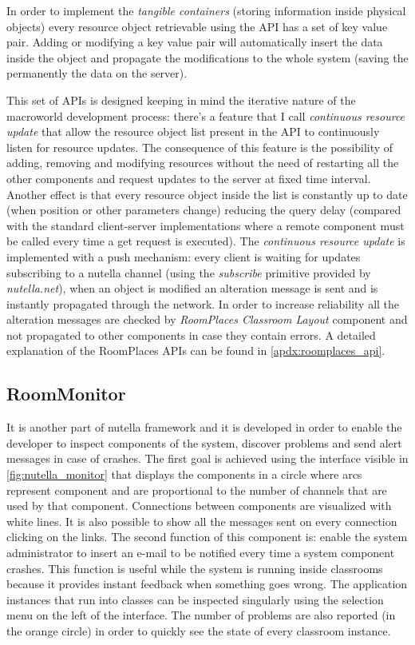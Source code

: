 In order to implement the \textit{tangible containers} (storing information inside physical objects) every resource object retrievable using the API has a set of key value pair. Adding or modifying a key value pair will automatically insert the data inside the object and propagate the modifications to the whole system (saving the permanently the data on the server).

This set of APIs is designed keeping in mind the iterative nature of the macroworld development process: there's a feature that I call \textit{continuous resource update} that allow the resource object list present in the API to continuously listen for resource updates. The consequence of this feature is the possibility of adding, removing and modifying resources without the need of restarting all the other components and request updates to the server at fixed time interval. Another effect is that every resource object inside the list is constantly up to date (when position or other parameters change) reducing the query delay (compared with the standard client-server implementations where a remote component must be called every time a get request is executed). The \textit{continuous resource update} is implemented with a push mechanism: every client is waiting for updates subscribing to a nutella channel (using the \textit{subscribe} primitive provided by \textit{nutella.net}), when an object is modified an alteration message is sent and is instantly propagated through the network. In order to increase reliability all the alteration messages are checked by \textit{RoomPlaces Classroom Layout} component and not propagated to other components in case they contain errors. A detailed explanation of the RoomPlaces APIs can be found in \autoref{apdx:roomplaces_api}.

\subsection{RoomMonitor}
It is another part of nutella framework and it is developed in order to enable the developer to inspect components of the system, discover problems and send alert messages in case of crashes. The first goal is achieved using the interface visible in \ref{fig:nutella_monitor} that displays the components in a circle where arcs represent component and are proportional to the number of channels that are used by that component. Connections between components are visualized with white lines. It is also possible to show all the messages sent on every connection clicking on the links. The second function of this component is: enable the system administrator to insert an e-mail to be notified every time a system component crashes. This function is useful while the system is running inside classrooms because it provides instant feedback when something goes wrong. The application instances that run into classes can be inspected singularly using the selection menu on the left of the interface. The number of problems are also reported (in the orange circle) in order to quickly see the state of every classroom instance.

